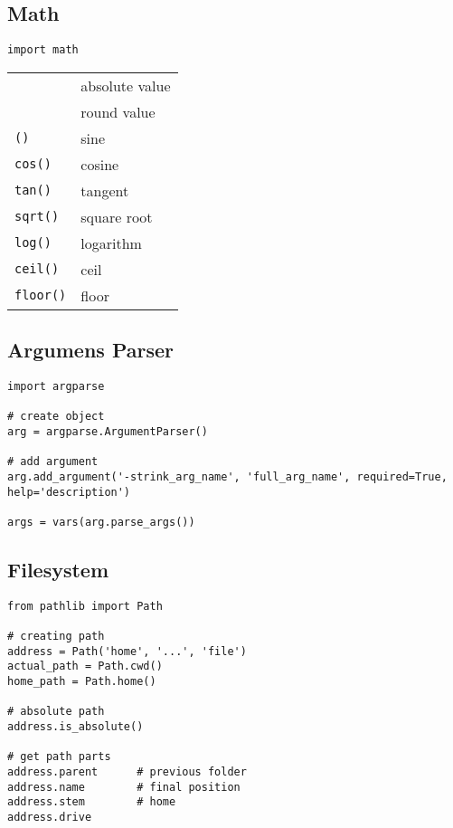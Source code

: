 \subsection{Math}

\begin{verbatim}
import math
\end{verbatim}

\begin{tabular}{@{}ll@{}}
    \verb!!    & absolute value \\
    \verb!!    & round value \\
    \verb!()!    & sine \\
    \verb!cos()!    & cosine \\
    \verb!tan()!    & tangent \\
    \verb!sqrt()!    & square root \\
    \verb!log()!    & logarithm \\
    \verb!ceil()!    & ceil \\
    \verb!floor()!    & floor \\
\end{tabular}



\subsection{Argumens Parser}

\begin{verbatim}
import argparse

# create object
arg = argparse.ArgumentParser()

# add argument
arg.add_argument('-strink_arg_name', 'full_arg_name', required=True, help='description')

args = vars(arg.parse_args())
\end{verbatim}



\subsection{Filesystem}

\begin{verbatim}
from pathlib import Path

# creating path
address = Path('home', '...', 'file')
actual_path = Path.cwd()
home_path = Path.home()

# absolute path
address.is_absolute()

# get path parts
address.parent      # previous folder
address.name        # final position
address.stem        # home
address.drive
\end{verbatim}



